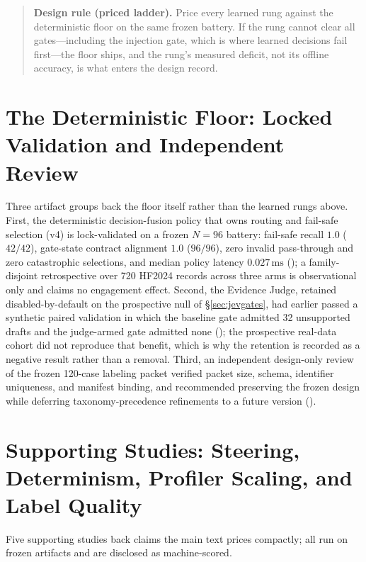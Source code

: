 \begin{quote}
\textbf{Design rule (priced ladder).} Price every learned rung against the
deterministic floor on the same frozen battery. If the rung cannot clear all
gates---including the injection gate, which is where learned decisions fail
first---the floor ships, and the rung's measured deficit, not its offline
accuracy, is what enters the design record.
\end{quote}

\section{The Deterministic Floor: Locked Validation and Independent Review}
\label{app:floorvalidation}
Three artifact groups back the floor itself rather than the learned rungs
above. First, the deterministic decision-fusion policy that owns routing
and fail-safe selection (v4) is lock-validated on a frozen $N=96$ battery:
fail-safe recall $1.0$ ($42/42$), gate-state contract alignment $1.0$
($96/96$), zero invalid pass-through and zero catastrophic selections, and
median policy latency $0.027\,\mathrm{ms}$
();
a family-disjoint retrospective over 720 HF2024 records across three arms
is observational only and claims no engagement effect. Second, the
Evidence Judge, retained disabled-by-default on the prospective null of
\S\ref{sec:jevgates}, had earlier passed a synthetic paired validation in
which the baseline gate admitted 32 unsupported drafts and the
judge-armed gate admitted none
();
the prospective real-data cohort did not reproduce that benefit, which is
why the retention is recorded as a negative result rather than a removal.
Third, an independent design-only review of the frozen 120-case labeling
packet verified packet size, schema, identifier uniqueness, and manifest
binding, and recommended preserving the frozen design while deferring
taxonomy-precedence refinements to a future version
().

\section{Supporting Studies: Steering, Determinism, Profiler Scaling, and Label Quality}
\label{app:supporting}
Five supporting studies back claims the main text prices compactly; all
run on frozen artifacts and are disclosed as machine-scored.

